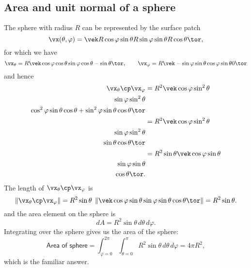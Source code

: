 \subsection{Area and unit normal of a sphere}
\label{sec:area-of-sphere-example}
The sphere with radius $R$ can be represented by the surface patch
\begin{equation}
  \vx(\theta,\varphi) = 
  \vek 
  R\cos\varphi \sin\theta \\
  R\sin\varphi \sin\theta \\
  R\cos\theta
  \tor,
  \label{eq:sphere-patch-example}
\end{equation}
for which we have
\[
  \vx_\theta = R \vek
  \cos\varphi \cos\theta \\
  \sin\varphi \cos\theta \\
  -\sin\theta
  \tor,
  \qquad
  \vx_\varphi = R \vek
  -\sin\varphi \sin\theta \\
  \cos\varphi \sin\theta \\
  0
  \tor
\]
and hence
\begin{align*}
  \vx_\theta\cp\vx_\varphi
  &= R^2
  \vek
  \cos\varphi \sin^2\theta \\
  \sin\varphi \sin^2\theta \\
  \cos^2\varphi \sin\theta\cos\theta +
  \sin^2\varphi \sin\theta\cos\theta 
  \tor \\
  &= R^2
  \vek
  \cos\varphi \sin^2\theta \\
  \sin\varphi \sin^2\theta \\
  \sin\theta\cos\theta 
  \tor \\
  &=R^2\sin\theta \vek
  \cos\varphi \sin\theta \\
  \sin\varphi \sin\theta \\
  \cos \theta
  \tor.
  \label{eq:xtheta-cross-xphi-sphere}
\end{align*}
The length of $\vx_\theta\cp\vx_\varphi$ is
\[
  \|\vx_\theta\cp\vx_\varphi\|
  =R^2\sin\theta\;  \left\|\vek
  \cos\varphi \sin\theta \\
  \sin\varphi \sin\theta \\
  \cos \theta
  \tor
  \right\| 
  =R^2\sin\theta.
\]
and the area element on the sphere is
\[
  dA = R^2\sin\theta \, d\theta\,d\varphi.
\]
Integrating over the sphere gives us the area of the sphere:
\begin{equation}
  \textsf{Area of sphere}
  =
  \int_{\varphi=0}^{2\pi} \int_{\theta=0}^\pi
  R^2 \sin \theta\, d\theta\, d\varphi
  =
  4\pi R^2,
  \label{eq:area-of-sphere-example}
\end{equation}
which is the familiar answer.

